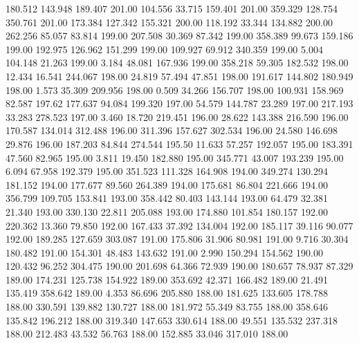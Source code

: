  180.512  143.948  189.407       201.00
 104.556   33.715  159.401       201.00
 359.329  128.754  350.761       201.00
 173.384  127.342  155.321       200.00
 118.192   33.344  134.882       200.00
 262.256   85.057   83.814       199.00
 207.508   30.369   87.342       199.00
 358.389   99.673  159.186       199.00
 192.975  126.962  151.299       199.00
 109.927   69.912  340.359       199.00
   5.004  104.148   21.263       199.00
   3.184   48.081  167.936       199.00
 358.218   59.305  182.532       198.00
  12.434   16.541  244.067       198.00
  24.819   57.494   47.851       198.00
 191.617  144.802  180.949       198.00
   1.573   35.309  209.956       198.00
   0.509   34.266  156.707       198.00
 100.931  158.969   82.587       197.62
 177.637   94.084  199.320       197.00
  54.579  144.787   23.289       197.00
 217.193   33.283  278.523       197.00
   3.460   18.720  219.451       196.00
  28.622  143.388  216.590       196.00
 170.587  134.014  312.488       196.00
 311.396  157.627  302.534       196.00
  24.580  146.698   29.876       196.00
 187.203   84.844  274.544       195.50
  11.633   57.257  192.057       195.00
 183.391   47.560   82.965       195.00
   3.811   19.450  182.880       195.00
 345.771   43.007  193.239       195.00
   6.094   67.958  192.379       195.00
 351.523  111.328  164.908       194.00
 349.274  130.294  181.152       194.00
 177.677   89.560  264.389       194.00
 175.681   86.804  221.666       194.00
 356.799  109.705  153.841       193.00
 358.442   80.403  143.144       193.00
  64.479   32.381   21.340       193.00
 330.130   22.811  205.088       193.00
 174.880  101.854  180.157       192.00
 220.362   13.360   79.850       192.00
 167.433   37.392  134.004       192.00
 185.117   39.116   90.077       192.00
 189.285  127.659  303.087       191.00
 175.806   31.906   80.981       191.00
   9.716   30.304  180.482       191.00
 154.301   48.483  143.632       191.00
   2.990  150.294  154.562       190.00
 120.432   96.252  304.475       190.00
 201.698   64.366   72.939       190.00
 180.657   78.937   87.329       189.00
 174.231  125.738  154.922       189.00
 353.692   42.371  166.482       189.00
  21.491  135.419  358.642       189.00
   4.353   86.696  205.880       188.00
 181.625  133.605  178.788       188.00
 330.591  139.882  130.727       188.00
 181.972   55.349   83.755       188.00
 358.646  135.842  196.212       188.00
 319.340  147.653  330.614       188.00
  49.551  135.532  237.318       188.00
 212.483   43.532   56.763       188.00
 152.885   33.046  317.010       188.00
